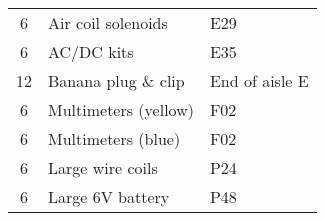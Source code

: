 \documentclass{article}
\begin{document}
\begin{center}
\begin{tabular}{|c|p{2.5in}|l|}
6 & 
Air coil solenoids & 
\begin{minipage}{1.0in} 
\raggedright 
\vspace{1ex}
E29 \par
\vspace{1ex}
\end{minipage}
\\

6 & 
AC/DC kits & 
\begin{minipage}{1.0in} 
\raggedright 
\vspace{1ex}
E35 \par
\vspace{1ex}
\end{minipage}
\\

12 & 
Banana plug \& clip & 
\begin{minipage}{1.0in} 
\raggedright 
\vspace{1ex}
End of aisle E \par
\vspace{1ex}
\end{minipage}
\\

6 & 
Multimeters (yellow) & 
\begin{minipage}{1.0in} 
\raggedright 
\vspace{1ex}
F02 \par
\vspace{1ex}
\end{minipage}
\\

6 & 
Multimeters (blue) & 
\begin{minipage}{1.0in} 
\raggedright 
\vspace{1ex}
F02 \par
\vspace{1ex}
\end{minipage}
\\

6 & 
Large wire coils & 
\begin{minipage}{1.0in} 
\raggedright 
\vspace{1ex}
P24 \par
\vspace{1ex}
\end{minipage}
\\

6 & 
Large 6V battery & 
\begin{minipage}{1.0in} 
\raggedright 
\vspace{1ex}
P48 \par
\vspace{1ex}
\end{minipage}
\\


\end{tabular}
\end{center}
\end{document}
